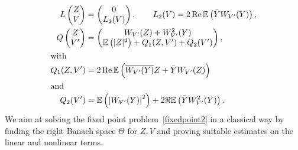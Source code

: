 \documentclass[AHL, Unicode, longabstracts,published]{cedram}
\newcommand{\E}{\mathbb{E}}
\DeclareMathOperator{\Rel}{Re}
\begin{document}
\begin{align} 
L
\begin{pmatrix} Z \\ V
\end{pmatrix} &=
\begin{pmatrix}
0 \\ L_2(V)
\end{pmatrix}, \qquad L_2(V)=2 \Rel \E\left(\bar Y W_{V'}(Y)\right),\label{def:L2}
\\
Q
\begin{pmatrix} Z \\ V'
\end{pmatrix} &=
\begin{pmatrix}
W_{V'}(Z) + W_{V'}^2(Y) \\
\E\left(|Z|^2\right) + Q_1 (Z,V') + Q_2(V')
\end{pmatrix},\label{def:Q}
\\
\intertext{with}
Q_1(Z,V') &= 2 \Rel \E\left(\overline{W_{V'}(Y)} Z + \bar Y W_{V'}(Z)\right)\label{def:Q1}
\\
\intertext{and}
Q_2 (V') &= \E \left(\left|W_{V'}(Y)\right|^2\right) +2 \Re \E\left(\bar Y W_{V'}^2 (Y)\right).\label{def:Q2}
\end{align}
We aim at solving the fixed point problem~\eqref{fixedpoint2} in a classical way by finding the right Banach space $\Theta$ for $Z,V$ and proving suitable estimates on the linear and nonlinear terms.
\end{document}
